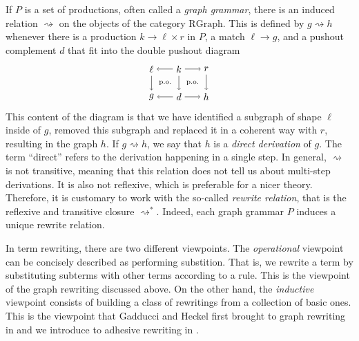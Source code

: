 \documentclass{amsart}
\newcommand{\RGraph}{\cat{RGraph}}
\newcommand{\cat}[1]{\mathrm{#1}}
\newcommand{\squigto}{\rightsquigarrow}
\theoremstyle{remark}
\theoremstyle{definition}
\begin{document}
If $ P $ is a set of productions, often called a \emph{graph grammar},
there is an induced relation $ \squigto $ on the objects of the category
$ \RGraph $. This is defined by $ g \squigto h $ whenever there is a
production $ k \to \ell \times r $ in $ P $, a match $ \ell \to g $,
and a pushout complement $ d $ that fit into the double pushout
diagram
%
\[
  \begin{tikzpicture}
    \node (1) at (0,1) {$ \ell $};
    \node (2) at (1,1) {$ k $};
    \node (3) at (2,1) {$ r $};
    \node (4) at (0,0) {$ g $};
    \node (5) at (1,0) {$ d $};
    \node (6) at (2,0) {$ h $};
    \draw [->] (2) to node [] {\scriptsize{$  $}} (1);
    \draw [->] (2) to node [] {\scriptsize{$  $}} (3);
    \draw [->] (5) to node [] {\scriptsize{$  $}} (4);
    \draw [->] (5) to node [] {\scriptsize{$  $}} (6);
    \draw [->] (1) to node [] {\scriptsize{$  $}} (4);
    \draw [->] (2) to node [] {\scriptsize{$  $}} (5);
    \draw [->] (3) to node [] {\scriptsize{$  $}} (6);
    \node () at (0.5,0.5) {\scriptsize{p.o.}};
    \node () at (1.5,0.5) {\scriptsize{p.o.}};
  \end{tikzpicture}
\]
%
This content of the diagram is that we have identified a subgraph of
shape $ \ell $ inside of $ g $, removed this subgraph and replaced it
in a coherent way with $ r $, resulting in the graph $ h $. If
$ g \squigto h $, we say that $ h $ is a \emph{direct derivation} of
$ g $. The term ``direct'' refers to the derivation happening in a
single step.  In general, $ \squigto $ is not transitive, meaning that
this relation does not tell us about multi-step derivations. It is
also not reflexive, which is preferable for a nicer theory.
Therefore, it is customary to work with the so-called \emph{rewrite
  relation}, that is the reflexive and transitive closure
$ \squigto^\ast $. Indeed, each graph grammar $ P $ induces a unique
rewrite relation.

In term rewriting, there are two different viewpoints. The
\emph{operational} viewpoint can be concisely described as performing
substition. That is, we rewrite a term by substituting subterms with
other terms according to a rule. This is the viewpoint of the graph
rewriting discussed above.  On the other hand, the \emph{inductive}
viewpoint consists of building a class of rewritings from a collection
of basic ones.  This is the viewpoint that Gadducci and Heckel first
brought to graph rewriting in
%
%
and we introduce to adhesive rewriting in .
%
%
\end{document}

